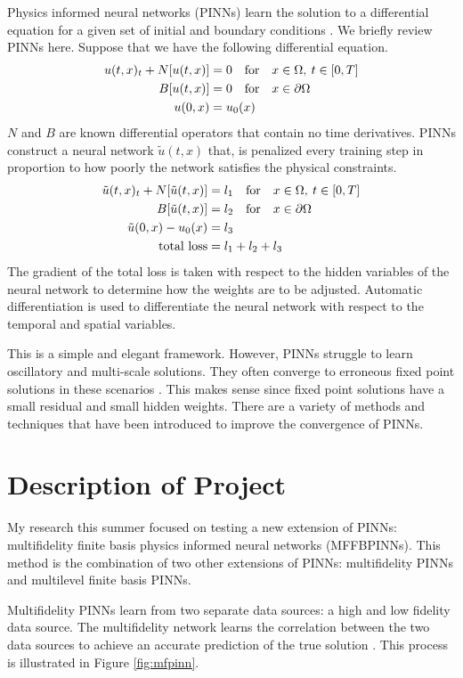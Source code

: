\documentclass[12pt]{article}
\def\~{\tilde}
\begin{document}
Physics informed neural networks (PINNs) learn the solution to a differential equation for a given set of initial and boundary conditions \cite{pinns}. We briefly review PINNs here. Suppose that we have the following differential equation.
\begin{align} 
	u(t,x)_t + N[u(t,x)] &= 0 \quad \text{for} \quad x \in \Omega, \: t \in [0,T] \notag\\
	B[u(t,x)] &= 0 \quad \text{for} \quad x \in \partial \Omega\\
	u(0,x) &= u_0(x) \notag
\end{align} \label{eq:dq}
$N$ and $B$ are known differential operators that contain no time derivatives. PINNs construct a neural network $\~u(t,x)$ that, is penalized every training step in proportion to how poorly the network satisfies the physical constraints.
\begin{align}
	\~u(t,x)_t + N[\~u(t,x)] &= l_1 \quad \text{for} \quad x \in \Omega, \: t \in [0,T] \notag \\
	B[\~u(t,x)] &= l_2 \quad \text{for} \quad x \in \partial \Omega\\
	\~u(0,x) - u_0(x)& = l_3 \notag \\
	\text{total loss}& = l_1 + l_2 + l_3 \notag
\end{align} \label{eq:loss}
\noindent The gradient of the total loss is taken with respect to the hidden variables of the neural network to determine how the weights are to be adjusted. Automatic differentiation is used to differentiate the neural network with respect to the temporal and spatial variables. 
\par This is a simple and elegant framework. However, PINNs struggle to learn oscillatory and multi-scale solutions. They often converge to erroneous fixed point solutions in these scenarios \cite{fixedpts}. This makes sense since fixed point solutions have a small residual and small hidden weights. There are a variety of methods and techniques that have been introduced to improve the convergence of PINNs. 
\section{Description of Project}
\par My research this summer focused on testing a new extension of PINNs: multifidelity finite basis physics informed neural networks (MFFBPINNs). This method is the combination of two other extensions of PINNs: multifidelity PINNs and multilevel finite basis PINNs.
\par Multifidelity PINNs learn from two separate data sources: a high and low fidelity data source. The multifidelity network learns the correlation between the two data sources to achieve an accurate prediction of the true solution \cite{mfpinns}. This process is illustrated in Figure \ref{fig:mfpinn}.
\end{document}
